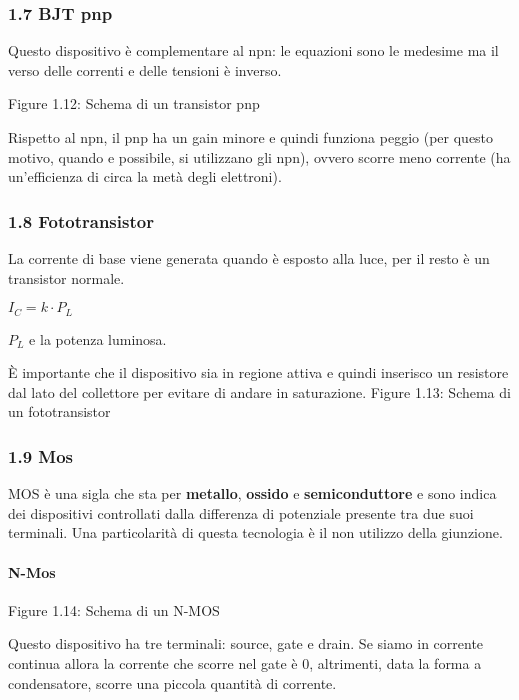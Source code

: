 \documentclass[
]{article}
\begin{document}
\subsubsection{1.7 BJT pnp}\label{bjt-pnp}

Questo dispositivo è complementare al npn: le equazioni sono le medesime
ma il verso delle correnti e delle tensioni è inverso.

Figure 1.12: Schema di un transistor pnp

Rispetto al npn, il pnp ha un gain minore e quindi funziona peggio (per
questo motivo, quando e possibile, si utilizzano gli npn), ovvero scorre
meno corrente (ha un'efficienza di circa la metà degli elettroni).

\subsubsection{1.8 Fototransistor}\label{fototransistor}

La corrente di base viene generata quando è esposto alla luce, per il
resto è un transistor normale.

\(I_{C}=k\cdot P_{L}\)

\(P_{L}\) e la potenza luminosa.

È importante che il dispositivo sia in regione attiva e quindi inserisco
un resistore dal lato del collettore per evitare di andare in
saturazione. Figure 1.13: Schema di un fototransistor

\subsubsection{1.9 Mos}\label{mos}

MOS è una sigla che sta per \textbf{metallo}, \textbf{ossido} e
\textbf{semiconduttore} e sono indica dei dispositivi controllati dalla
differenza di potenziale presente tra due suoi terminali. Una
particolarità di questa tecnologia è il non utilizzo della giunzione.

\paragraph{N-Mos}\label{n-mos}

Figure 1.14: Schema di un N-MOS

Questo dispositivo ha tre terminali: source, gate e drain. Se siamo in
corrente continua allora la corrente che scorre nel gate è 0,
altrimenti, data la forma a condensatore, scorre una piccola quantità di
corrente.
\end{document}
